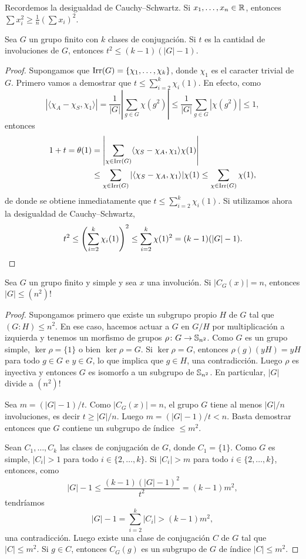 Recordemos la desigualdad de Cauchy--Schwartz. Si $x_1,\dots,x_n\in\mathbb{R}$, entonces
$\sum x_i^2\geq\frac{1}{n}(\sum x_i)^2$. 

\begin{lemma}
Sea $G$ un grupo finito con $k$ clases de conjugación. 
Si $t$ es la cantidad de involuciones de $G$, entonces 
$t^2\leq (k-1)(|G|-1)$. 
\end{lemma}

\begin{proof}
Supongamos que $\operatorname{Irr}(G)=\{\chi_1,\dots,\chi_k\}$, donde $\chi_1$ es el 
caracter trivial de $G$. Primero vamos a demostrar que 
$t\leq\sum_{i=2}^k\chi_i(1)$. En efecto, 
como 
\[
|\langle\chi_A-\chi_S,\chi_1\rangle|
=\frac{1}{|G|}\left|\sum_{g\in G}\chi(g^2)\right|
\leq\frac{1}{|G|}\sum_{g\in G}|\chi(g^2)|\leq 1,
\]
entonces 
\begin{align*}
1+t=\theta(1)
&=\left|\sum_{\chi\in\operatorname{Irr}(G)}\langle\chi_S-\chi_A,\chi_1\rangle\chi(1)\right|\\
&\leq\sum_{\chi\in\operatorname{Irr}(G)}|\langle\chi_S-\chi_A,\chi_1\rangle|\chi(1)
\leq\sum_{\chi\in\operatorname{Irr}(G)}\chi(1),
\end{align*}
de donde se obtiene inmediatamente que $t\leq\sum_{i=2}^k\chi_i(1)$. 
Si utilizamos ahora 
la desigualdad de Cauchy--Schwartz, 
\[
t^2\leq\left(\sum_{i=2}^k\chi_i(1)\right)^2
\leq\sum_{i=2}^k\chi(1)^2=(k-1)(|G|-1).\qedhere
\]
\end{proof}

\begin{theorem}
Sea $G$ un grupo finito y simple y sea $x$ una involución. Si $|C_G(x)|=n$, entonces $|G|\leq (n^2)!$	
\end{theorem}

\begin{proof}
Supongamos primero que existe un subgrupo propio $H$ de $G$ tal que
$(G:H)\leq n^2$. En ese caso, hacemos actuar a $G$ en $G/H$ por multiplicación a izquierda 
y tenemos un morfismo de grupos $\rho\colon G\to\mathbb{S}_{n^2}$. Como $G$ es un grupo simple, 
$\ker\rho=\{1\}$ o bien $\ker\rho=G$. Si $\ker\rho=G$, entonces $\rho(g)(yH)=yH$ para todo
$g\in G$ e $y\in G$, lo que implica que $g\in H$, una contradicción. Luego $\rho$ es inyectiva
y entonces $G$ es isomorfo a un subgrupo de $\mathbb{S}_{n^2}$. En particular, $|G|$ divide a $(n^2)!$

Sea $m=(|G|-1)/t$. 
Como $|C_G(x)|=n$, el grupo $G$ tiene al menos $|G|/n$ involuciones, es decir $t\geq |G|/n$. Luego
$m=(|G|-1)/t<n$. Basta demostrar entonces que $G$ contiene un subgrupo de índice $\leq m^2$. 

Sean $C_1,\dots,C_k$ las clases de conjugación de $G$, donde $C_1=\{1\}$. 
Como $G$ es simple, $|C_i|>1$ 
para todo $i\in\{2,\dots,k\}$.  
Si $|C_i|>m$ para todo $i\in\{2,\dots,k\}$, entonces, como
\[
|G|-1\leq\frac{(k-1)(|G|-1)^2}{t^2}=(k-1)m^2,
\]
tendríamos 
\[
|G|-1=\sum_{i=2}^k|C_i|>(k-1)m^2,
\]
una contradicción. Luego existe una clase de conjugación $C$ de $G$ tal que $|C|\leq m^2$. Si $g\in C$, entonces
$C_G(g)$ es un subgrupo de $G$ de índice $|C|\leq m^2$.
\end{proof}

